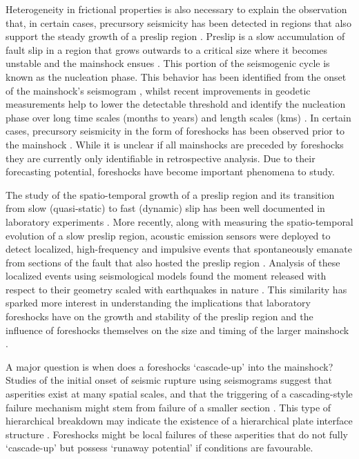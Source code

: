 \documentclass[preprint,1p, 10pt,authoryear]{elsarticle}
\begin{document}
Heterogeneity in frictional properties is also necessary to explain the observation that, in certain cases, precursory seismicity has been detected in regions that also support the steady growth of a preslip region \citep{Kato2012, Kato2016, Obara2016, Ruiz2014, Bouchon2013,Buergmann2004}. Preslip is a slow accumulation of fault slip in a region that grows outwards to a critical size where it becomes unstable and the mainshock ensues \citep{Mogi1985, Ohnaka1992,Ben-Zion2008}. This portion of the seismogenic cycle is known as the nucleation phase. This behavior has been identified from the onset of the mainshock's seismogram \citep{Iio1995, Ellsworth1995, Beroza1996}, whilst recent improvements in geodetic measurements help to lower the detectable threshold and identify the nucleation phase over long time scales (months to years) and length scales (kms) \citep[e.g.,][]{Roeloffs2006,Wang2014,Ruiz2014, Socquet2017}.  In certain cases, precursory seismicity in the form of foreshocks has been observed prior to the mainshock \citep[e.g.,][]{Dodge1995, Dodge1996, Bouchon2011}. While it is unclear if all mainshocks are preceded by foreshocks \citep{Brodsky2014, Mignan2014, Seif2018} they are currently only identifiable in retrospective analysis. Due to their forecasting potential, foreshocks have become important phenomena to study.

The study of the spatio-temporal growth of a preslip region  and its transition from slow (quasi-static) to fast (dynamic) slip has been well documented in laboratory experiments \citep{Dieterich1978,Okubo1984, Ohnaka1999, Nielsen2010, Latour2013, Fukuyama2018, Zhuo2018, Ke2018, Buijze2020}. More recently, along with measuring the spatio-temporal evolution of a slow preslip region, acoustic emission sensors were deployed to detect localized, high-frequency and impulsive events that spontaneously emanate from sections of the fault that also hosted the preslip region \citep{Ma2002, McLaskey2013, McLaskey2014a, Selvadurai2015, Passelegue2017, Zhuo2018a}.  Analysis of these localized events using seismological models found the moment released with respect to their geometry scaled with earthquakes in nature \citep{McLaskey2014, Selvadurai2019}. This similarity has sparked more interest in understanding the implications that laboratory foreshocks have on the growth and stability of the preslip region and the influence of foreshocks themselves on the size and timing of the larger mainshock \citep{McLaskey2019}.  

A major question is when does a foreshocks `cascade-up' into the mainshock? Studies of the initial onset of seismic rupture using seismograms suggest that asperities exist at many spatial scales, and that the triggering of a cascading-style failure mechanism might stem from failure of a smaller section \citep{Okuda2018, Ide2019}. This type of hierarchical breakdown may indicate the existence of a hierarchical plate interface structure \citep{Ide2005, Aochi2014, Aochi2017}. Foreshocks might be local failures of these asperities that do not fully `cascade-up' but possess `runaway potential' if conditions are favourable. 
\end{document}
